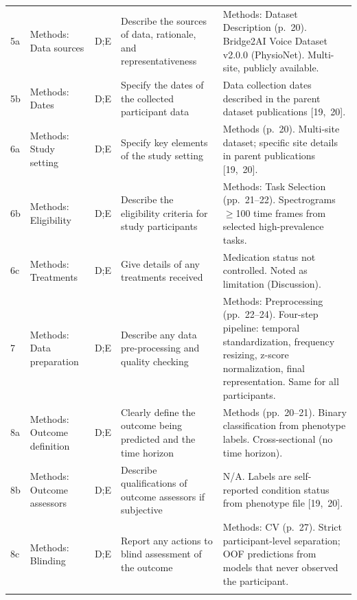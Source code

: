 \documentclass[11pt,a4paper]{article}
\begin{document}
{\begin{longtable}{C{0.6cm} L{2.2cm} C{0.6cm} L{5.5cm} L{4.5cm}}
5a & Methods: Data sources & D;E & Describe the sources of data, rationale, and representativeness & Methods: Dataset Description (p.~20). Bridge2AI Voice Dataset v2.0.0 (PhysioNet). Multi-site, publicly available. \\
\addlinespace

5b & Methods: Dates & D;E & Specify the dates of the collected participant data & Data collection dates described in the parent dataset publications [19,~20]. \\
\addlinespace

6a & Methods: Study setting & D;E & Specify key elements of the study setting & Methods (p.~20). Multi-site dataset; specific site details in parent publications [19,~20]. \\
\addlinespace

6b & Methods: Eligibility & D;E & Describe the eligibility criteria for study participants & Methods: Task Selection (pp.~21--22). Spectrograms $\geq$100 time frames from selected high-prevalence tasks. \\
\addlinespace

6c & Methods: Treatments & D;E & Give details of any treatments received & Medication status not controlled. Noted as limitation (Discussion). \\
\addlinespace

7 & Methods: Data preparation & D;E & Describe any data pre-processing and quality checking & Methods: Preprocessing (pp.~22--24). Four-step pipeline: temporal standardization, frequency resizing, z-score normalization, final representation. Same for all participants. \\
\addlinespace

8a & Methods: Outcome definition & D;E & Clearly define the outcome being predicted and the time horizon & Methods (pp.~20--21). Binary classification from phenotype labels. Cross-sectional (no time horizon). \\
\addlinespace

8b & Methods: Outcome assessors & D;E & Describe qualifications of outcome assessors if subjective & N/A. Labels are self-reported condition status from phenotype file [19,~20]. \\
\addlinespace

8c & Methods: Blinding & D;E & Report any actions to blind assessment of the outcome & Methods: CV (p.~27). Strict participant-level separation; OOF predictions from models that never observed the participant. \\
\addlinespace


\end{longtable}}
\end{document}
